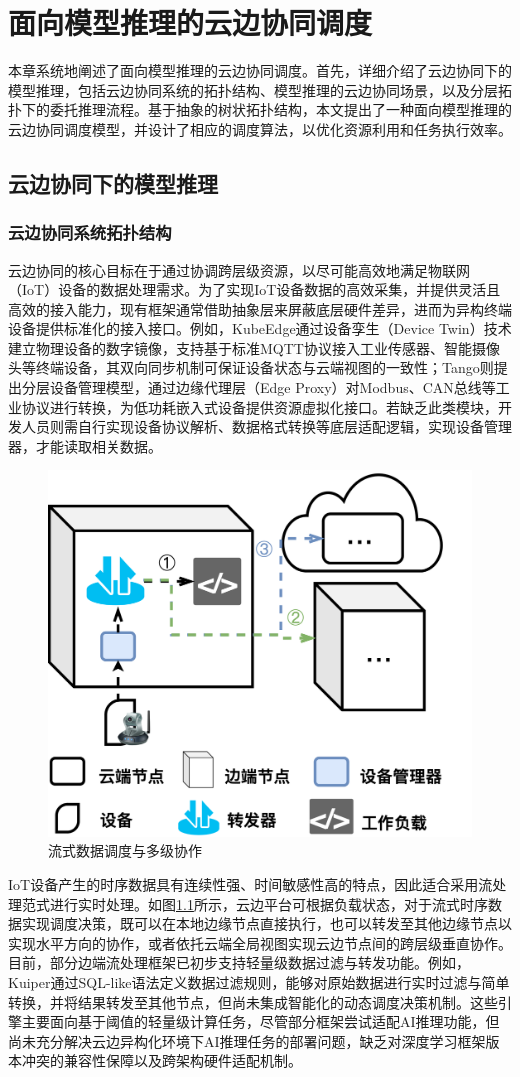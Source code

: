
\chapter{面向模型推理的云边协同调度}

本章系统地阐述了面向模型推理的云边协同调度。首先，详细介绍了云边协同下的模型推理，包括云边协同系统的拓扑结构、模型推理的云边协同场景，以及分层拓扑下的委托推理流程。基于抽象的树状拓扑结构，本文提出了一种面向模型推理的云边协同调度模型，并设计了相应的调度算法，以优化资源利用和任务执行效率。

\section{云边协同下的模型推理}

\subsection{云边协同系统拓扑结构}

云边协同的核心目标在于通过协调跨层级资源，以尽可能高效地满足物联网（IoT）设备的数据处理需求。为了实现IoT设备数据的高效采集，并提供灵活且高效的接入能力，现有框架通常借助抽象层来屏蔽底层硬件差异，进而为异构终端设备提供标准化的接入接口。例如，KubeEdge\cite{xiong2018extend}通过设备孪生（Device Twin）技术建立物理设备的数字镜像，支持基于标准MQTT协议接入工业传感器、智能摄像头等终端设备，其双向同步机制可保证设备状态与云端视图的一致性；Tango\cite{bagchi2017tango}则提出分层设备管理模型，通过边缘代理层（Edge Proxy）对Modbus、CAN总线等工业协议进行转换，为低功耗嵌入式设备提供资源虚拟化接口。若缺乏此类模块，开发人员则需自行实现设备协议解析、数据格式转换等底层适配逻辑，实现设备管理器，才能读取相关数据。

\begin{figure}[ht]
  \centering
  \includegraphics[width=0.45\linewidth]{pics/3-1流处理.png}
  \caption{流式数据调度与多级协作}
  \label{fig:3-1flow}
\end{figure}

IoT设备产生的时序数据具有连续性强、时间敏感性高的特点，因此适合采用流处理范式进行实时处理\cite{de2018distributed,wang2020edge}。如图\ref{fig:3-1flow}所示，云边平台可根据负载状态，对于流式时序数据实现调度决策，既可以在本地边缘节点直接执行，也可以转发至其他边缘节点以实现水平方向的协作，或者依托云端全局视图实现云边节点间的跨层级垂直协作。目前，部分边端流处理框架已初步支持轻量级数据过滤与转发功能。例如，Kuiper\cite{ekuiper}通过SQL-like语法定义数据过滤规则，能够对原始数据进行实时过滤与简单转换，并将结果转发至其他节点，但尚未集成智能化的动态调度决策机制。这些引擎主要面向基于阈值的轻量级计算任务，尽管部分框架尝试适配AI推理功能，但尚未充分解决云边异构化环境下AI推理任务的部署问题，缺乏对深度学习框架版本冲突的兼容性保障以及跨架构硬件适配机制。

